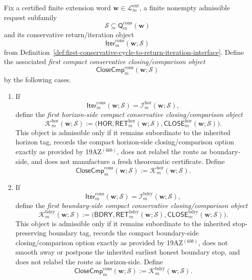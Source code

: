 \begin{definition}
\label{def:first-compact-conservative-closing-comparison-form}
Fix a certified finite extension word \(\mathbf w\in\mathcal L^{\mathrm{ext}}_{m}\), a finite nonempty admissible request subfamily
\[
  \mathcal S \subseteq \mathsf{Q}^{\mathrm{cons}}_{m}(\mathbf w)
\]
and its conservative return/iteration object
\[
  \mathsf{Iter}^{\mathrm{cons}}_{m}(\mathbf w;\mathcal S)
\]
from Definition~\ref{def:first-conservative-cycle-to-return-iteration-interface}. Define the associated \emph{first compact conservative closing/comparison object}
\[
  \mathsf{CloseCmp}^{\mathrm{cons}}_{m}(\mathbf w;\mathcal S)
\]
by the following cases.
\begin{enumerate}[label=(\roman*)]
  \item If
  \[
    \mathsf{Iter}^{\mathrm{cons}}_{m}(\mathbf w;\mathcal S)
    =
    \mathcal I^{\mathrm{hor}}_{m}(\mathbf w;\mathcal S),
  \]
define the \emph{first horizon-side compact conservative closing/comparison object}
\[
  \mathcal K^{\mathrm{hor}}_{m}(\mathbf w;\mathcal S)
  :=
  \bigl(
    \mathsf{HOR},
    \mathsf{RET}^{\mathrm{hor}}_{m}(\mathbf w;\mathcal S),
    \mathsf{CLOSE}^{\mathrm{hor}}_{m}(\mathbf w;\mathcal S)
  \bigr).
\]
This object is admissible only if it remains subordinate to the inherited horizon tag, records the compact horizon-side closing/comparison option exactly as provided by 19AZ$^{(6bb)}$, does not relabel the route as boundary-side, and does not manufacture a fresh theorematic certificate. Define
\[
  \mathsf{CloseCmp}^{\mathrm{cons}}_{m}(\mathbf w;\mathcal S)
  :=
  \mathcal K^{\mathrm{hor}}_{m}(\mathbf w;\mathcal S).
\]

  \item If
  \[
    \mathsf{Iter}^{\mathrm{cons}}_{m}(\mathbf w;\mathcal S)
    =
    \mathcal I^{\mathrm{bdry}}_{m}(\mathbf w;\mathcal S),
  \]
define the \emph{first boundary-side compact conservative closing/comparison object}
\[
  \mathcal K^{\mathrm{bdry}}_{m}(\mathbf w;\mathcal S)
  :=
  \bigl(
    \mathsf{BDRY},
    \mathsf{RET}^{\mathrm{bdry}}_{m}(\mathbf w;\mathcal S),
    \mathsf{CLOSE}^{\mathrm{bdry}}_{m}(\mathbf w;\mathcal S)
  \bigr).
\]
This object is admissible only if it remains subordinate to the inherited stop-preserving boundary tag, records the compact boundary-side closing/comparison option exactly as provided by 19AZ$^{(6bb)}$, does not smooth away or postpone the inherited earliest honest boundary stop, and does not relabel the route as horizon-side. Define
\[
  \mathsf{CloseCmp}^{\mathrm{cons}}_{m}(\mathbf w;\mathcal S)
  :=
  \mathcal K^{\mathrm{bdry}}_{m}(\mathbf w;\mathcal S).
\]
\end{enumerate}
\end{definition}

